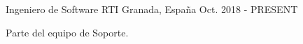 

\begin{cventries}

  \cventry
    {Ingeniero de Software} %
    {RTI} %
    {Granada, España} %
    {Oct. 2018 - PRESENT} %
    {
      \begin{cvitems} %
        \item {Parte del equipo de Soporte.}
      \end{cvitems}
    }

\end{cventries}
